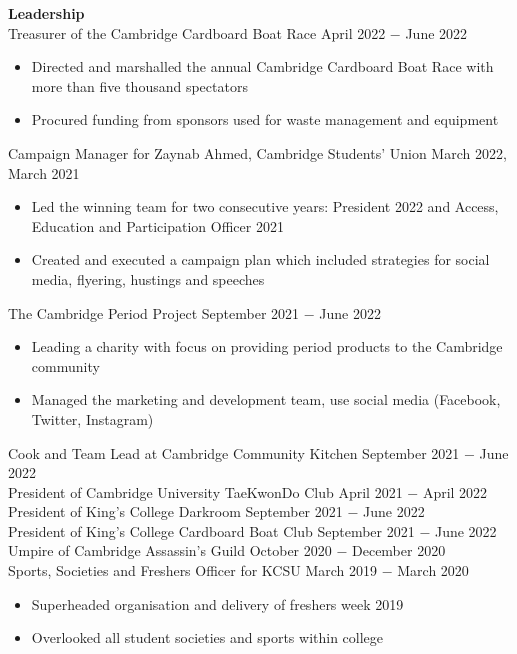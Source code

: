 \documentclass{article}
\begin{document}
\textbf{Leadership}\\
Treasurer of the Cambridge Cardboard Boat Race \hfill April 2022 $-$ June 2022
\begin{itemize}
    \item Directed and marshalled the annual Cambridge Cardboard Boat Race with more than five thousand spectators
    \item Procured funding from sponsors used for waste management and equipment
\end{itemize}
Campaign Manager for Zaynab Ahmed, Cambridge Students' Union \hfill March 2022, March 2021
\begin{itemize}
    \item Led the winning team for two consecutive years: President 2022 and Access, Education and Participation Officer 2021
    \item Created and executed a campaign plan which included strategies for social media, flyering, hustings and speeches
\end{itemize}
The Cambridge Period Project \hfill  September 2021 $-$ June 2022
\begin{itemize}
    \item Leading a charity with focus on providing period products to the Cambridge community
    \item Managed the marketing and development team, use social media (Facebook, Twitter, Instagram)
\end{itemize}
Cook and Team Lead at Cambridge Community Kitchen \hfill September 2021 $-$ June 2022\\
President of Cambridge University TaeKwonDo Club \hfill April 2021 $-$ April 2022\\
President of King's College Darkroom \hfill September 2021 $-$ June 2022\\ 
President of King's College Cardboard Boat Club \hfill September 2021 $-$ June 2022\\
Umpire of Cambridge Assassin's Guild \hfill October 2020 $-$ December 2020\\
Sports, Societies and Freshers Officer for KCSU \hfill March 2019 $-$ March 2020
\begin{itemize}
    \item Superheaded organisation and delivery of freshers week 2019
    \item Overlooked all student societies and sports within college
\end{itemize} \medskip
\end{document}
